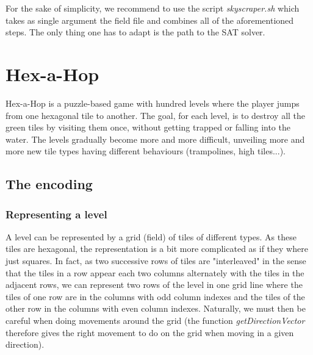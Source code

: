\documentclass[a4paper, 12pt, titlepage]{article}
\begin{document}
For the sake of simplicity, we recommend to use the script \emph{skyscraper.sh} which takes as single argument the field file and combines all of the aforementioned steps. The only thing one has to adapt is the path to the SAT solver.



\section{Hex-a-Hop}
Hex-a-Hop is a puzzle-based game with hundred levels where the player jumps from
one hexagonal tile to another. The goal, for each level, is to destroy all the
green tiles by visiting them once, without getting trapped or falling into the
water. The levels gradually become more and more difficult, unveiling more and
more new tile types having different behaviours (trampolines, high tiles...).

\subsection{The encoding}

\subsubsection{Representing a level}
A level can be represented by a grid (field) of tiles of different types. As
these tiles are hexagonal, the representation is a bit more complicated as if
they where just squares. In fact, as two successive rows of tiles are
"interleaved" in the sense that the tiles in a row appear each two columns
alternately with the tiles in the adjacent rows, we can represent two rows of
the level in one grid line where the tiles of one row are in the columns with
odd column indexes and the tiles of the other row in the columns with even
column indexes. Naturally, we must then be careful when doing movements around
the grid (the function {\em getDirectionVector} therefore gives the right
movement to do on the grid when moving in a given direction).
\end{document}
